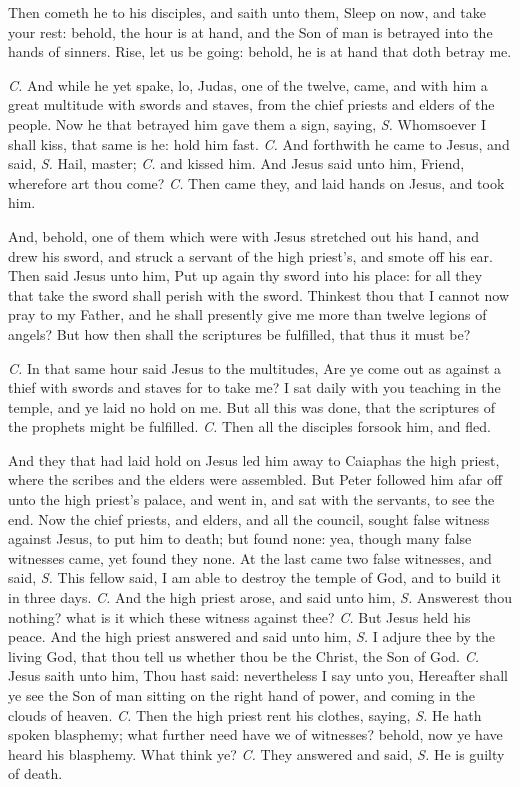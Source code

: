 Then cometh he to his disciples, and saith unto them, {} Sleep on now, and take your rest: behold, the hour is at hand, and the Son of man is betrayed into the hands of sinners. Rise, let us be going: behold, he is at hand that doth betray me.

\textit{C.} And while he yet spake, lo, Judas, one of the twelve, came, and with him a great multitude with swords and staves, from the chief priests and elders of the people. Now he that betrayed him gave them a sign, saying, \textit{S.} Whomsoever I shall kiss, that same is he: hold him fast. \textit{C.} And forthwith he came to Jesus, and said, \textit{S.} Hail, master; \textit{C.} and kissed him. And Jesus said unto him, {} Friend, wherefore art thou come? \textit{C.} Then came they, and laid hands on Jesus, and took him.

And, behold, one of them which were with Jesus stretched out his hand, and drew his sword, and struck a servant of the high priest's, and smote off his ear. Then said Jesus unto him, {} Put up again thy sword into his place: for all they that take the sword shall perish with the sword. Thinkest thou that I cannot now pray to my Father, and he shall presently give me more than twelve legions of angels? But how then shall the scriptures be fulfilled, that thus it must be?

\textit{C.} In that same hour said Jesus to the multitudes, {} Are ye come out as against a thief with swords and staves for to take me? I sat daily with you teaching in the temple, and ye laid no hold on me. But all this was done, that the scriptures of the prophets might be fulfilled. \textit{C.} Then all the disciples forsook him, and fled.

And they that had laid hold on Jesus led him away to Caiaphas the high priest, where the scribes and the elders were assembled. But Peter followed him afar off unto the high priest's palace, and went in, and sat with the servants, to see the end. Now the chief priests, and elders, and all the council, sought false witness against Jesus, to put him to death; but found none: yea, though many false witnesses came, yet found they none. At the last came two false witnesses, and said, \textit{S.} This fellow said, I am able to destroy the temple of God, and to build it in three days. \textit{C.} And the high priest arose, and said unto him, \textit{S.} Answerest thou nothing? what is it which these witness against thee? \textit{C.} But Jesus held his peace. And the high priest answered and said unto him, \textit{S.} I adjure thee by the living God, that thou tell us whether thou be the Christ, the Son of God. \textit{C.} Jesus saith unto him, {} Thou hast said: nevertheless I say unto you, Hereafter shall ye see the Son of man sitting on the right hand of power, and coming in the clouds of heaven. \textit{C.} Then the high priest rent his clothes, saying, \textit{S.} He hath spoken blasphemy; what further need have we of witnesses? behold, now ye have heard his blasphemy. What think ye? \textit{C.} They answered and said, \textit{S.} He is guilty of death.

